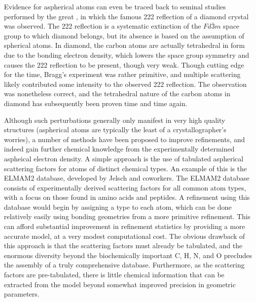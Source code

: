 \begin{refsection}
Evidence for aspherical atoms can even be traced back to seminal studies performed by the great \citeauthor{Bragg1920}, in which the famous 222 reflection of a diamond crystal was observed.
The 222 reflection is a systematic extinction of the $Fd\bar{3}m$ space group to which diamond belongs, but its absence is based on the assumption of spherical atoms.
In diamond, the carbon atoms are actually tetrahedral in form due to the bonding electron density, which lowers the space group symmetry and causes the 222 reflection to be present, though very weak.\autocite{Bragg1920}
Though cutting edge for the time, Bragg's experiment was rather primitive, and multiple scattering likely contributed some intensity to the observed 222 reflection.
The observation was nonetheless correct, and the tetrahedral nature of the carbon atoms in diamond has subsequently been proven time and time again.

Although such perturbations generally only manifest in very high quality structures (aspherical atoms are typically the least of a crystallographer's worries), a number of methods have been proposed to improve refinements, and indeed gain further chemical knowledge from the experimentally determined aspheical electron density.
A simple approach is the use of tabulated aspherical scattering factors for atoms of distinct chemical types.
An example of this is the ELMAM2 database, developed by Jelsch and coworkers.\autocite{Domagaa2012}
The ELMAM2 database consists of experimentally derived scattering factors for all common atom types, with a focus on those found in amino acids and peptides.
A refinement using this database would begin by assigning a type to each atom, which can be done relatively easily using bonding geometries from a more primitive refinement.
This can afford substantial improvement in refinement statistics by providing a more accurate model, at a very modest computational cost.
The obvious drawback of this approach is that the scattering factors must already be tabulated, and the enormous diversity beyond the biochemically important C, H, N, and O precludes the assembly of a truly comprehensive database.
Furthermore, as the scattering factors are pre-tabulated, there is little chemical information that can be extracted from the model beyond somewhat improved precision in geometric parameters.


\end{refsection}
